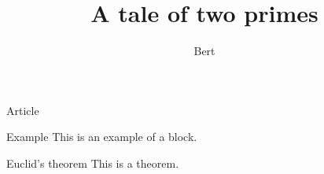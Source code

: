 \documentclass{beamer}
\author{Bert}
\title{A tale of two primes}
\begin{document}
\begin{frame}{Article}
\begin{block}{Example}
This is an example of a block.
\end{block}
\begin{block}{Euclid's theorem}
This is a theorem.
\end{block}
\end{frame}
\end{document}
